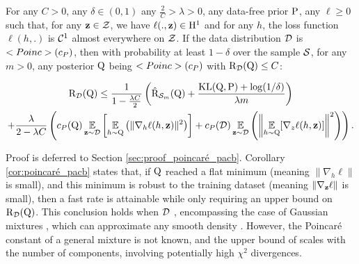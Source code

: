 \begin{corollary}\label{cor:poincaré_pacb}
For any $C>0$, any $\delta\in (0,1)$ any $\frac{2}{C}>\lambda >0$, any data-free prior $\P$, any $\ell\geq 0$ such that, for any $\z\in\Zcal$, we have $\ell(.,\z)\in \mathrm{H}^{1}$ and for any $h$, the loss function $\ell(h,.)$ is $\Ccal^1$ almost everywhere on $\Zcal$.
If the data distribution $\D$ is $\Poinc(c_P)$, then with probability at least $1-\delta$ over the sample $\S$, for any $m>0$, any posterior $\Q$ being $\Poinc(c_P)$ with $\Risk_\D(\Q)\leq C$:

\begin{multline*}
\Risk_{\D}(\Q) \leq \frac{1}{1-\frac{\lambda C}{2}}\LP \hat{\Risk}_{\S_m}(\Q) + \frac{\KL(\Q,\P) +\log(1/\delta)}{\lambda m}\RP \\
+ \frac{\lambda}{2-\lambda C}\LP c_{P}(\Q)\EE_{\z\sim\D} \LB \EE_{h\sim \Q}\LP \|\nabla_h \ell(h,\z)\|^2 \RP \RB  + c_{P}(\D)\EE_{\z\sim\D} \LP \LM\EE_{h\sim\Q}[\nabla_z \ell(h,\z)] \RM^2\RP  \RP.
\end{multline*}     
\end{corollary}   
Proof is deferred to Section \ref{sec:proof_poincaré_pacb}.
Corollary \ref{cor:poincaré_pacb} states that, if $\Q$ reached a flat minimum (meaning $\|\nabla_h\ell\|$ is small), and this minimum is robust to the training dataset (meaning $\|\nabla_\z\ell\|$ is small), then a fast rate is attainable while only requiring an upper bound on $\Risk_\D(\Q)$.
This conclusion holds when $\D$ \Poinc, encompassing the case of Gaussian mixtures \citep{schlichting2019poinc}, which can approximate any smooth density \citep[as recalled in][]{gat2022grad}.
However, the Poincaré constant of a general mixture is not known, and the upper bound of \citet{schlichting2019poinc} scales with the number of components, involving potentially high $\chi^2$ divergences.\\


